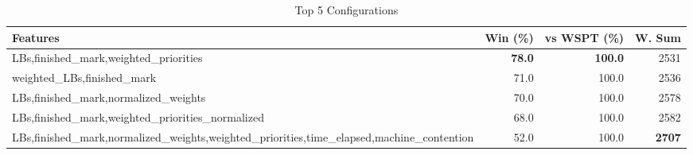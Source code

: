\begin{table}[htbp]%
\centering%
\begin{tabular}{lrrr}%
\toprule%
\textbf{Features}&\textbf{Win (\%)}&\textbf{vs WSPT (\%)}&\textbf{W. Sum}\\%
\midrule%
LBs,finished_mark,weighted_priorities&\textbf{78.0}&\textbf{100.0}&2531\\%
weighted_LBs,finished_mark&71.0&100.0&2536\\%
LBs,finished_mark,normalized_weights&70.0&100.0&2578\\%
LBs,finished_mark,weighted_priorities_normalized&68.0&100.0&2582\\%
LBs,finished_mark,normalized_weights,weighted_priorities,time_elapsed,machine_contention&52.0&100.0&\textbf{2707}\\%
\bottomrule%
\end{tabular}%
\caption{Top 5 Configurations}%
\label{tab:summary}%
\end{table}